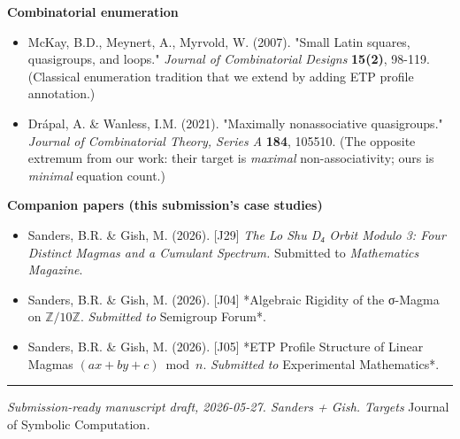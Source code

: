 \documentclass[11pt,reqno]{amsart}
\theoremstyle{plain}
\theoremstyle{definition}
\begin{document}
\textbf{Combinatorial enumeration}
\begin{itemize}
\item McKay, B.D., Meynert, A., Myrvold, W. (2007). "Small Latin squares, quasigroups, and loops." \textit{Journal of Combinatorial Designs} \textbf{15(2)}, 98-119. (Classical enumeration tradition that we extend by adding ETP profile annotation.)
\item Drápal, A. \& Wanless, I.M. (2021). "Maximally nonassociative quasigroups." \textit{Journal of Combinatorial Theory, Series A} \textbf{184}, 105510. (The opposite extremum from our work: their target is \textit{maximal} non-associativity; ours is \textit{minimal} equation count.)
\end{itemize}

\textbf{Companion papers (this submission's case studies)}
\begin{itemize}
\item Sanders, B.R. \& Gish, M. (2026). [J29] \textit{The Lo Shu D₄ Orbit Modulo 3: Four Distinct Magmas and a Cumulant Spectrum.} Submitted to \textit{Mathematics Magazine}.
\item Sanders, B.R. & Gish, M. (2026). [J04] *Algebraic Rigidity of the σ-Magma on $\mathbb{Z}/10\mathbb{Z}$.\textit{ Submitted to }Semigroup Forum*.
\item Sanders, B.R. & Gish, M. (2026). [J05] *ETP Profile Structure of Linear Magmas $(ax+by+c) \bmod n$.\textit{ Submitted to }Experimental Mathematics*.
\end{itemize}

\medskip\hrule\medskip

\textit{Submission-ready manuscript draft, 2026-05-27. Sanders + Gish. Targets }Journal of Symbolic Computation\textit{.}
\end{document}
